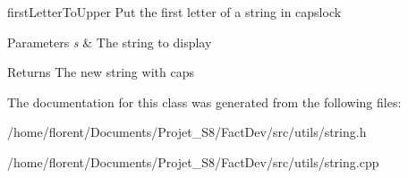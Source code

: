 first\-Letter\-To\-Upper Put the first letter of a string in capslock 


\begin{DoxyParams}{Parameters}
{\em s} & The string to display \\
\hline
\end{DoxyParams}
\begin{DoxyReturn}{Returns}
The new string with caps 
\end{DoxyReturn}


The documentation for this class was generated from the following files\-:\begin{DoxyCompactItemize}
\item 
/home/florent/\-Documents/\-Projet\-\_\-\-S8/\-Fact\-Dev/src/utils/string.\-h\item 
/home/florent/\-Documents/\-Projet\-\_\-\-S8/\-Fact\-Dev/src/utils/string.\-cpp\end{DoxyCompactItemize}
